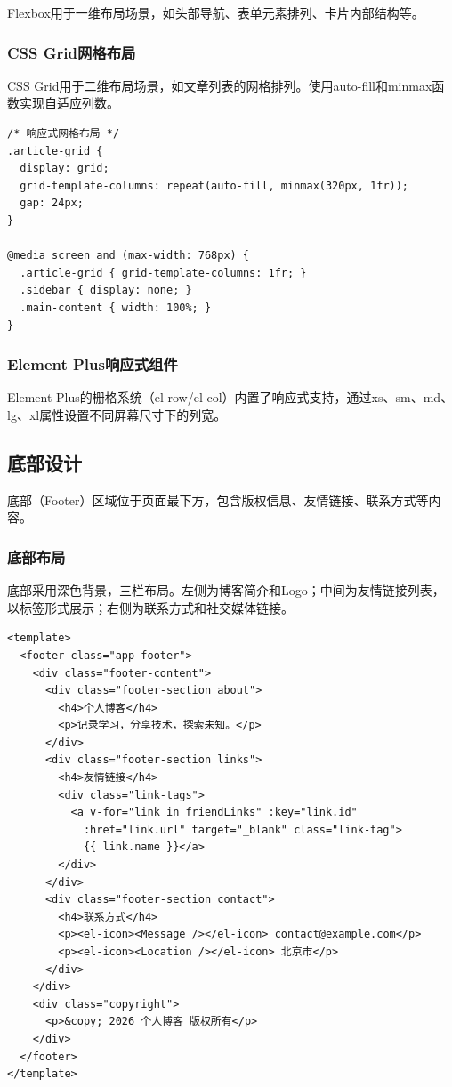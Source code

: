 \documentclass[12pt,a4paper]{article}
\begin{document}
Flexbox用于一维布局场景，如头部导航、表单元素排列、卡片内部结构等。

\subsubsection{CSS Grid网格布局}

CSS Grid用于二维布局场景，如文章列表的网格排列。使用auto-fill和minmax函数实现自适应列数。

\begin{lstlisting}[language={}, caption=响应式布局CSS代码]
/* 响应式网格布局 */
.article-grid {
  display: grid;
  grid-template-columns: repeat(auto-fill, minmax(320px, 1fr));
  gap: 24px;
}

@media screen and (max-width: 768px) {
  .article-grid { grid-template-columns: 1fr; }
  .sidebar { display: none; }
  .main-content { width: 100%; }
}
\end{lstlisting}

\subsubsection{Element Plus响应式组件}

Element Plus的栅格系统（el-row/el-col）内置了响应式支持，通过xs、sm、md、lg、xl属性设置不同屏幕尺寸下的列宽。

\subsection{底部设计}

底部（Footer）区域位于页面最下方，包含版权信息、友情链接、联系方式等内容。

\subsubsection{底部布局}

底部采用深色背景，三栏布局。左侧为博客简介和Logo；中间为友情链接列表，以标签形式展示；右侧为联系方式和社交媒体链接。

\begin{lstlisting}[language={}, basicstyle=\ttfamily\small, caption=底部组件代码]
<template>
  <footer class="app-footer">
    <div class="footer-content">
      <div class="footer-section about">
        <h4>个人博客</h4>
        <p>记录学习，分享技术，探索未知。</p>
      </div>
      <div class="footer-section links">
        <h4>友情链接</h4>
        <div class="link-tags">
          <a v-for="link in friendLinks" :key="link.id"
            :href="link.url" target="_blank" class="link-tag">
            {{ link.name }}</a>
        </div>
      </div>
      <div class="footer-section contact">
        <h4>联系方式</h4>
        <p><el-icon><Message /></el-icon> contact@example.com</p>
        <p><el-icon><Location /></el-icon> 北京市</p>
      </div>
    </div>
    <div class="copyright">
      <p>&copy; 2026 个人博客 版权所有</p>
    </div>
  </footer>
</template>
\end{lstlisting}
\end{document}

